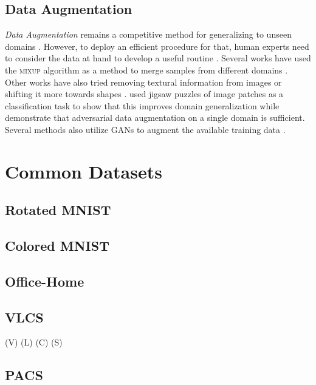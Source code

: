 \subsection{Data Augmentation}
\emph{Data Augmentation} remains a competitive method for generalizing to unseen domains \citep{zhang2019unseen}. However, to deploy an efficient procedure for that, human experts need to consider the data at hand to develop a useful routine \citep{gulrajani2020search}. Several works have used the \textsc{mixup} \citep{ZhangCDL18} algorithm as a method to merge samples from different domains \citep{XuZNLWTZ20, yan2020improve, WangLK20, mancini2020}. Other works have also tried removing textural information from images \citep{WangHLX19} or shifting it more towards shapes \citep{nam2019reducing, asadi2019shape}. \citet{CarlucciDBCT19} used jigsaw puzzles of image patches as a classification task to show that this improves domain generalization while \citet{VolpiNSDMS18} demonstrate that adversarial data augmentation on a single domain is sufficient. Several methods also utilize GANs to augment the available training data  \citep{RahmanFBS19, ZhouYHX20, ShankarPCCJS18}. 

\section{Common Datasets}

\subsection{Rotated MNIST}

\subsection{Colored MNIST}

\subsection{Office-Home}
\citet{VenkateswaraECP17}

\subsection{VLCS}

(V) \citet{EveringhamGWWZ10} (L) \citet{RussellTMF08} (C) \citet{Griffin2007Caltech256OC} (S) \citet{ChoiLTW10}

\subsection{PACS}
\citet{LiYSH17}

